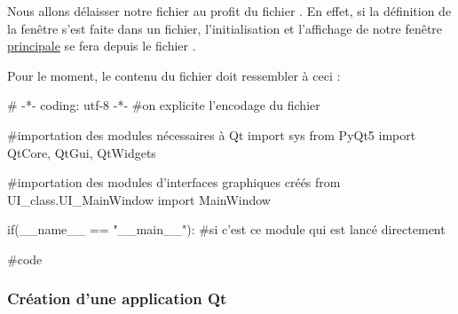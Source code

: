 \documentclass[12pt]{report}    %
\begin{document}
Nous allons délaisser notre fichier  au profit du fichier . En effet, si la définition de la fenêtre s'est faite dans un fichier, l'initialisation et l'affichage de notre fenêtre \underline{principale} se fera depuis le fichier .\smallSkip

Pour le moment, le contenu du fichier  doit ressembler à ceci :
\begin{pyCode}
# -*- coding: utf-8 -*-
#on  explicite l’encodage  du  fichier

#importation des modules nécessaires à Qt
import sys
from PyQt5 import QtCore, QtGui, QtWidgets

#importation des modules d'interfaces graphiques créés
from UI_class.UI_MainWindow import MainWindow


if(__name__ == "__main__"): #si c'est ce module qui est lancé directement

	#code
\end{pyCode}

\subsubsection{Création d'une application Qt}
\end{document}

